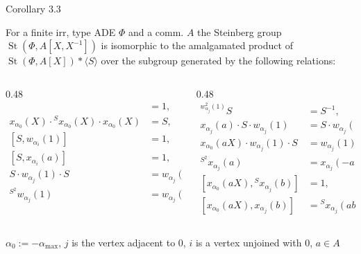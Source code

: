 \documentclass{beamer} %
\DeclareMathOperator{\St}{St}
\theoremstyle{definition}
\begin{document}
\begin{frame}{Corollary 3.3}

For a finite irr, type ADE $\Phi$ and a comm. $A$ the Steinberg group $\St(\Phi, A[X, X^{-1}])$ is isomorphic to the amalgamated product of $\St(\Phi, A[X]) * \langle S \rangle$ over the subgroup generated by the following relations: 

\scriptsize 

\begin{columns}[T,onlytextwidth]
\begin{column}{0.48\textwidth}
\begin{align*}
[S^2, x_{\alpha_0}(aX)] &= 1,
\\[0.3em]
x_{\alpha_0}(X)\cdot {}^{S}x_{\alpha_0}(X)\cdot x_{\alpha_0}(X) &= S,
\\[0.3em]
[S, w_{\alpha_i}(1)] &= 1,
\\[0.3em]
[S, x_{\alpha_i}(a)] &= 1,
\\[0.3em]
S \cdot w_{\alpha_j}(1) \cdot S
&= w_{\alpha_j}(1) \cdot S \cdot w_{\alpha_j}(1),
\\[0.3em]
{}^{S^2} w_{\alpha_j}(1) &= w_{\alpha_j}(-1),
\end{align*}
\end{column}

\begin{column}{0.48\textwidth}
\begin{align*}
{}^{w_{\alpha_j}^2(1)} S &= S^{-1},
\\[0.3em]
x_{\alpha_j}(a)\cdot S \cdot w_{\alpha_j}(1)
&= S \cdot w_{\alpha_j}(1) \cdot x_{\alpha_0}(aX),
\\[0.3em]
x_{\alpha_0}(aX)\cdot w_{\alpha_j}(1)\cdot S
&= w_{\alpha_j}(1)\cdot S \cdot x_{\alpha_j}(a),
\\[0.3em]
{}^{S^2} x_{\alpha_j}(a) &= x_{\alpha_j}(-a),
\\[0.3em]
[x_{\alpha_0}(aX), {}^{S} x_{\alpha_j}(b)] &= 1,
\\[0.3em]
[x_{\alpha_0}(aX), x_{\alpha_j}(b)]
&= {}^{S} x_{\alpha_j}(ab).
\end{align*}
\end{column}
\end{columns}

$\alpha_0 := - \alpha_\mathrm{max}$, $j$ is the vertex adjacent to $0$, $i$ is a vertex unjoined with $0$, $a \in A$
\end{frame}
\end{document}
